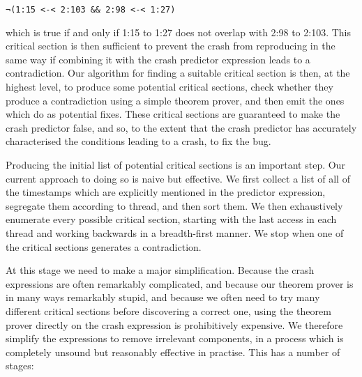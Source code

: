 \documentclass[10pt,a4paper]{report}
\begin{document}
\begin{verbatim}
¬(1:15 <-< 2:103 && 2:98 <-< 1:27)
\end{verbatim}

which is true if and only if 1:15 to 1:27 does not overlap with 2:98
to 2:103.  This critical section is then sufficient to prevent the
crash from reproducing in the same way if combining it with the crash
predictor expression leads to a contradiction.  Our algorithm for
finding a suitable critical section is then, at the highest level, to
produce some potential critical sections, check whether they produce a
contradiction using a simple theorem prover, and then emit the ones
which do as potential fixes.  These critical sections are guaranteed
to make the crash predictor false, and so, to the extent that the
crash predictor has accurately characterised the conditions leading to
a crash, to fix the bug.

Producing the initial list of potential critical sections is an
important step.  Our current approach to doing so is naive but
effective.  We first collect a list of all of the timestamps which are
explicitly mentioned in the predictor expression, segregate them
according to thread, and then sort them.  We then exhaustively
enumerate every possible critical section, starting with the last
access in each thread and working backwards in a breadth-first manner.
We stop when one of the critical sections generates a contradiction.

At this stage we need to make a major simplification.  Because the
crash expressions are often remarkably complicated, and because our
theorem prover is in many ways remarkably stupid, and because we often
need to try many different critical sections before discovering a
correct one, using the theorem prover directly on the crash expression
is prohibitively expensive.  We therefore simplify the expressions to
remove irrelevant components, in a process which is completely unsound
but reasonably effective in practise.  This has a number of stages:
\end{document}
